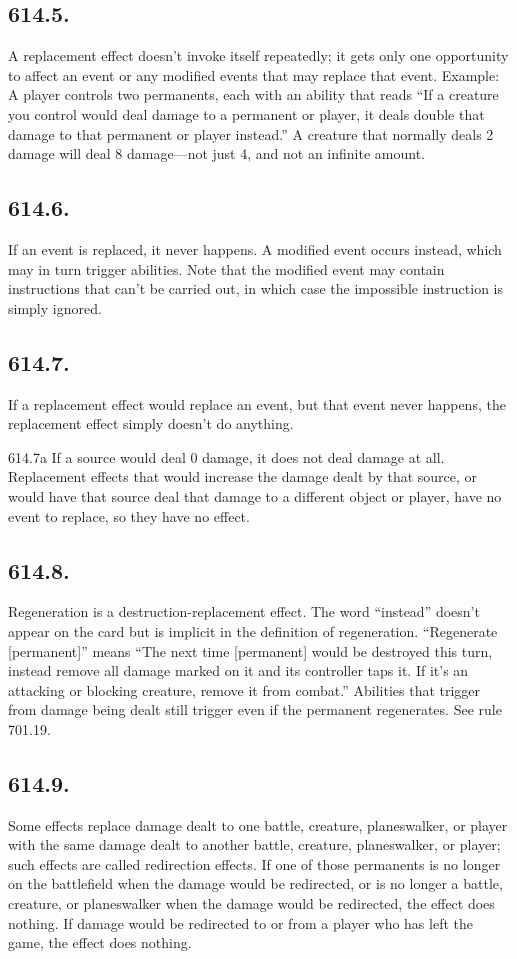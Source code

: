 \subsection*{614.5.}
A replacement effect doesn’t invoke itself repeatedly; it gets only one opportunity to affect an event or any modified events that may replace that event.
Example: A player controls two permanents, each with an ability that reads “If a creature you control would deal damage to a permanent or player, it deals double that damage to that permanent or player instead.” A creature that normally deals 2 damage will deal 8 damage—not just 4, and not an infinite amount.

\subsection*{614.6.}
If an event is replaced, it never happens. A modified event occurs instead, which may in turn trigger abilities. Note that the modified event may contain instructions that can’t be carried out, in which case the impossible instruction is simply ignored.

\subsection*{614.7.}
If a replacement effect would replace an event, but that event never happens, the replacement effect simply doesn’t do anything.

614.7a If a source would deal 0 damage, it does not deal damage at all. Replacement effects that would increase the damage dealt by that source, or would have that source deal that damage to a different object or player, have no event to replace, so they have no effect.

\subsection*{614.8.}
Regeneration is a destruction-replacement effect. The word “instead” doesn’t appear on the card but is implicit in the definition of regeneration. “Regenerate [permanent]” means “The next time [permanent] would be destroyed this turn, instead remove all damage marked on it and its controller taps it. If it’s an attacking or blocking creature, remove it from combat.” Abilities that trigger from damage being dealt still trigger even if the permanent regenerates. See rule 701.19.

\subsection*{614.9.}
Some effects replace damage dealt to one battle, creature, planeswalker, or player with the same damage dealt to another battle, creature, planeswalker, or player; such effects are called redirection effects. If one of those permanents is no longer on the battlefield when the damage would be redirected, or is no longer a battle, creature, or planeswalker when the damage would be redirected, the effect does nothing. If damage would be redirected to or from a player who has left the game, the effect does nothing.

